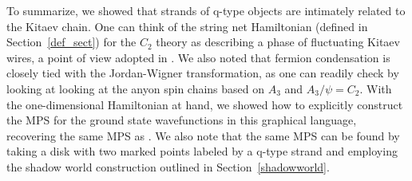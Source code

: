 To summarize, we showed that strands of q-type objects are intimately related to the Kitaev chain. 
One can think of the string net Hamiltonian (defined in Section~\ref{def_sect}) for the $C_2$ theory as describing a phase of fluctuating Kitaev wires, a point of view adopted in \cite{tarantino2016,ware2016,kapustin2017}.
We also noted that fermion condensation is closely tied with the Jordan-Wigner transformation, as one can readily check by looking at looking at the anyon spin chains based on $A_3$ and $A_3/\psi = C_2$.
With the one-dimensional Hamiltonian at hand, we showed how to explicitly construct the MPS for the ground state wavefunctions in this graphical language, recovering the same MPS as \cite{fidkowski2011,turzillo2016,bultinck2017b}.
We also note that the same MPS can be found by taking a disk with two marked points labeled by a q-type strand %
and employing the shadow world construction outlined in Section~\ref{shadowworld}.


